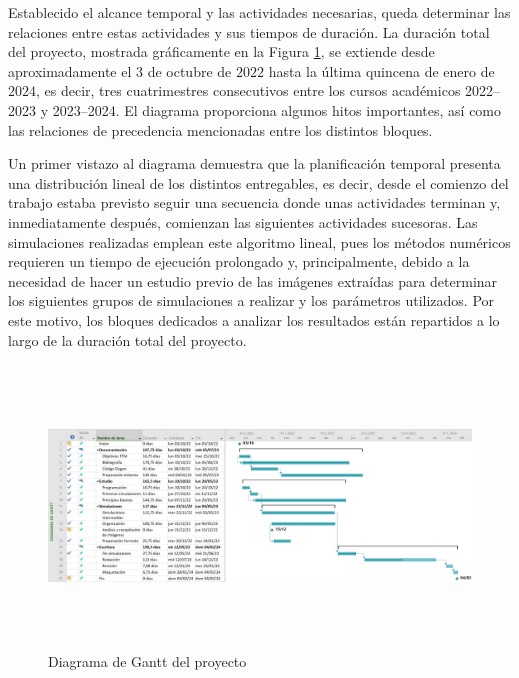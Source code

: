 Establecido el alcance temporal y las actividades necesarias, queda determinar las relaciones entre estas actividades y sus tiempos de duración. La duración total del proyecto, mostrada gráficamente en la Figura \ref{fig:ch9_gantt}, se extiende desde aproximadamente el $3$ de octubre de $2022$ hasta la última quincena de enero de $2024$, es decir, tres cuatrimestres consecutivos entre los cursos académicos \numrange{2022}{2023} y \numrange{2023}{2024}. El diagrama proporciona algunos hitos importantes, así como las relaciones de precedencia mencionadas entre los distintos bloques.

Un primer vistazo al diagrama demuestra que la planificación temporal presenta una distribución lineal de los distintos entregables, es decir, desde el comienzo del trabajo estaba previsto seguir una secuencia donde unas actividades terminan y, inmediatamente después, comienzan las siguientes actividades sucesoras. Las simulaciones realizadas emplean este algoritmo lineal, pues los métodos numéricos requieren un tiempo de ejecución prolongado y, principalmente, debido a la necesidad de hacer un estudio previo de las imágenes extraídas para determinar los siguientes grupos de simulaciones a realizar y los parámetros utilizados. Por este motivo, los bloques dedicados a analizar los resultados están repartidos a lo largo de la duración total del proyecto. 

\begin{figure}[htbp]
  \centering
  \includegraphics[height=7.5cm,width=\textwidth]{Figuras/ch9_gantt.pdf}
  \caption{Diagrama de Gantt del proyecto}
  \label{fig:ch9_gantt}
\end{figure}


